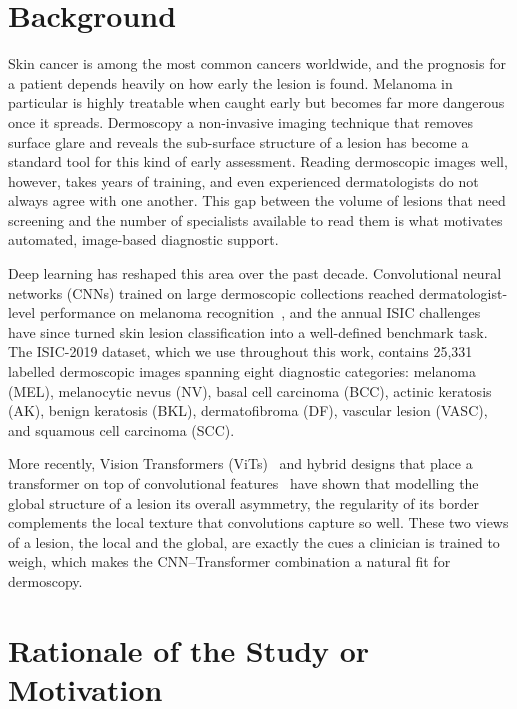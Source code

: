 \section{Background}

Skin cancer is among the most common cancers worldwide, and the prognosis for a
patient depends heavily on how early the lesion is found. Melanoma in
particular is highly treatable when caught early but becomes far more dangerous
once it spreads. Dermoscopy a non-invasive imaging technique that removes
surface glare and reveals the sub-surface structure of a lesion has become a
standard tool for this kind of early assessment. Reading dermoscopic images
well, however, takes years of training, and even experienced dermatologists do
not always agree with one another. This gap between the volume of lesions that
need screening and the number of specialists available to read them is what
motivates automated, image-based diagnostic support.

Deep learning has reshaped this area over the past decade. Convolutional neural
networks (CNNs) trained on large dermoscopic collections reached
dermatologist-level performance on melanoma recognition~\cite{esteva2017dermatologist},
and the annual ISIC challenges have since turned skin lesion classification into
a well-defined benchmark task. The ISIC-2019 dataset, which we use throughout
this work, contains 25{,}331 labelled dermoscopic images spanning eight
diagnostic categories: melanoma (MEL), melanocytic nevus (NV), basal cell
carcinoma (BCC), actinic keratosis (AK), benign keratosis (BKL),
dermatofibroma (DF), vascular lesion (VASC), and squamous cell carcinoma (SCC).

More recently, Vision Transformers (ViTs)~\cite{dosovitskiy2021vit} and hybrid
designs that place a transformer on top of convolutional
features~\cite{mehta2022mobilevit,li2022efficientformer} have shown that
modelling the global structure of a lesion its overall asymmetry, the
regularity of its border complements the local texture that convolutions
capture so well. These two views of a lesion, the local and the global, are
exactly the cues a clinician is trained to weigh, which makes the
CNN--Transformer combination a natural fit for dermoscopy.

\section{Rationale of the Study or Motivation}

